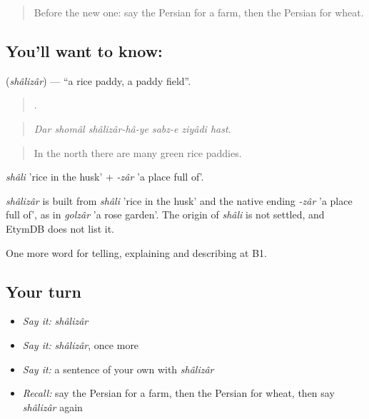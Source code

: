 \begin{quote}
Before the new one: say the Persian for a farm, then the Persian for wheat.
\end{quote}

\subsection*{You'll want to know: }
\textbf{} (\emph{shâlizâr}) — \textquotedblleft{}a rice paddy, a paddy field\textquotedblright{}.

\begin{quote}
     .
\end{quote}

\begin{quote}
\emph{Dar shomâl shâlizâr-hâ-ye sabz-e ziyâdi hast.}
\end{quote}

\begin{quote}
In the north there are many green rice paddies.
\end{quote}

\emph{shâli} 'rice in the husk' + \emph{-zâr} 'a place full of'.

\begin{cousinweb}
\emph{shâlizâr} is built from \emph{shâli} 'rice in the husk' and the native ending \emph{-zâr} 'a place full of', as in \emph{golzâr} 'a rose garden'. The origin of \emph{shâli} is not settled, and EtymDB does not list it.
\end{cousinweb}

\begin{grammarlens}[title={What you've built}]
One more word for telling, explaining and describing at B1.
\end{grammarlens}

\subsection*{Your turn}
\begin{itemize}
\raggedright
  \item \emph{Say it:} \emph{shâlizâr}
  \item \emph{Say it:} \emph{shâlizâr}, once more
  \item \emph{Say it:} a sentence of your own with \emph{shâlizâr}
  \item \emph{Recall:} say the Persian for a farm, then the Persian for wheat, then say \emph{shâlizâr} again
\end{itemize}

